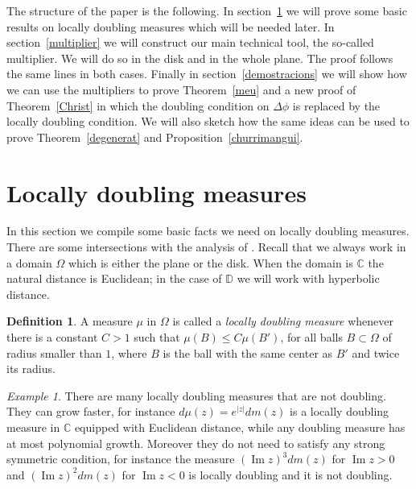\documentclass[12pt,twoside,final,psamsfonts]{amsart}
\theoremstyle{plain}
\theoremstyle{remark}
\newtheorem*{remark}{Remark}
\newtheorem*{example}{Example}
\theoremstyle{definition}
\newtheorem*{defi}{Definition}
\newcommand{\C}{{\mathbb C}}
\newcommand{\D}{{\mathbb D}}
\renewcommand{\Im}{\operatorname{Im}}
\begin{document}
The structure of the paper is the following. In section~\ref{doubling} we will
prove some basic results on locally 
doubling measures which will be needed later. In
section~\ref{multiplier} we will construct our main technical tool, the
so-called multiplier. We will do so in the disk and in the whole plane. The
proof follows the same lines in both cases. 
Finally in
section~\ref{demostracions} we will show how we can use the multipliers to prove
Theorem~\ref{meu} and a new proof of 
Theorem~\ref{Christ} in which the doubling condition on $\Delta\phi$
is replaced by the locally
doubling condition. We will also sketch
how the same ideas can be used to prove Theorem~\ref{degenerat} and
Proposition~\ref{churrimangui}.

\section{Locally doubling measures}\label{doubling}
In this section we compile some basic facts we need on locally doubling 
measures. There are some intersections with the analysis of
\cite{Christ91}.  Recall that we always work in a domain $\Omega$ which is
either the plane or the disk. When the domain is $\C$ the natural distance is
Euclidean; in the case of $\D$ we will work with hyperbolic
distance. 

\begin{defi}
A measure $\mu$ in $\Omega$ is called a \emph{locally  doubling measure}
whenever there is a constant $C>1$  such that $\mu(B)\le C \mu(B')$, for all
balls $B\subset \Omega$ of radius smaller than $1$,  where $B$ is the ball
with the same center as $B'$ and twice its radius.  
\end{defi}


\begin{example}  
There are many locally doubling measures that are not doubling. They can grow
faster, for instance $d\mu(z)=e^{|z|}dm(z)$ is a locally doubling measure in
$\C$ equipped with Euclidean distance, while any doubling measure has at
most polynomial growth. Moreover they do not need to satisfy any strong 
symmetric
condition, for instance the measure $(\Im z)^3dm(z)$ for $\Im z>0$ and
$(\Im z)^2dm(z)$ for $\Im z<0$ is locally doubling and it is not doubling.
\end{example}
\end{document}
